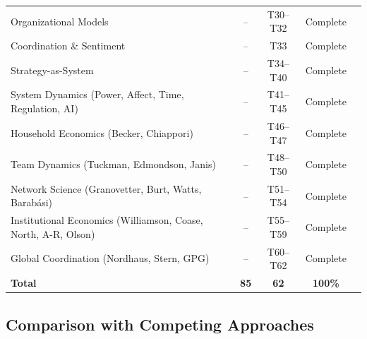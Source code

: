\begin{tcolorbox}[colback=green!5!white, colframe=green!75!black,
    title=Validation V8: Axiom Coverage Matrix]
\begin{center}
\begin{tabular}{lcccc}
\rowcolor{cyan!20}
Organizational Models & -- & T30--T32 & Complete \\
\rowcolor{magenta!20}
Coordination \& Sentiment & -- & T33 & Complete \\
\rowcolor{teal!20}
Strategy-as-System & -- & T34--T40 & Complete \\
\rowcolor{red!20}
System Dynamics (Power, Affect, Time, Regulation, AI) & -- & T41--T45 & Complete \\
\rowcolor{brown!20}
Household Economics (Becker, Chiappori) & -- & T46--T47 & Complete \\
\rowcolor{olive!20}
Team Dynamics (Tuckman, Edmondson, Janis) & -- & T48--T50 & Complete \\
\rowcolor{violet!20}
Network Science (Granovetter, Burt, Watts, Barabási) & -- & T51--T54 & Complete \\
\rowcolor{gray!20}
Institutional Economics (Williamson, Coase, North, A-R, Olson) & -- & T55--T59 & Complete \\
\rowcolor{blue!20}
Global Coordination (Nordhaus, Stern, GPG) & -- & T60--T62 & Complete \\
\midrule
\textbf{Total} & \textbf{85} & \textbf{62} & \textbf{100\%} \\
\bottomrule
\end{tabular}
\end{center}
\end{tcolorbox}

\subsection{Comparison with Competing Approaches}

